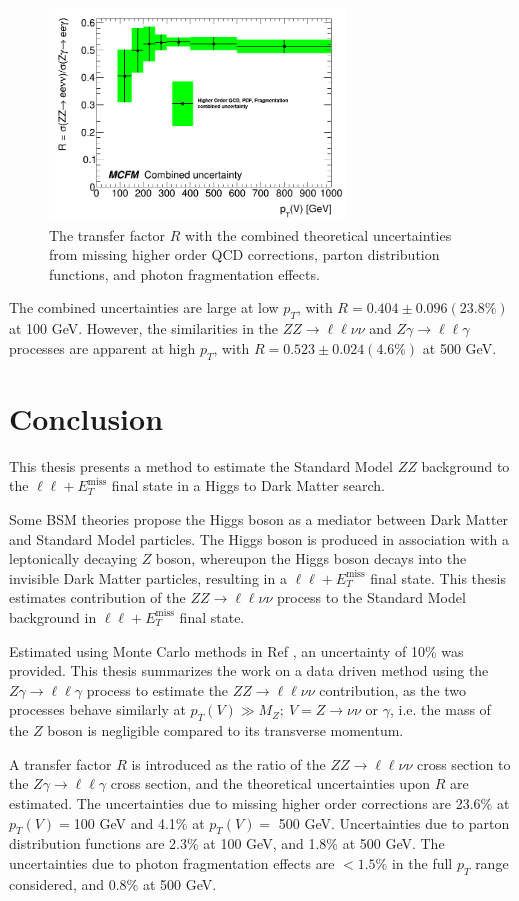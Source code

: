 \documentclass[12pt,a4paper,openright,twoside]{report}
\newcommand{\ZZ}{$ZZ\to \ell\ell\nu\nu$ }
\newcommand{\Zg}{$Z\gamma\to \ell\ell\gamma$ }
\newcommand{\llM}{$\ell\ell+E_T^{\mathrm{miss}}$ }
\begin{document}
\begin{figure}[H]
\centering
	\includegraphics[width=0.7\textwidth]{summary.png}
	\caption{The transfer factor $R$ with the combined theoretical uncertainties from missing higher order QCD corrections, parton distribution functions, and photon fragmentation effects.}
	\label{fig:summary}
\end{figure}

The combined uncertainties are large at low $p_T$, with $R=0.404\pm 0.096(23.8\%)$ at 100 GeV. However, the similarities in the \ZZ and \Zg processes are apparent at high $p_T$, with $R=0.523\pm 0.024 (4.6\%)$ at 500 GeV.

\chapter{Conclusion}
This thesis presents a method to estimate the Standard Model $ZZ$ background to the \llM final state in a Higgs to Dark Matter search. 

Some BSM theories propose the Higgs boson as a mediator between Dark Matter and Standard Model particles. The Higgs boson is produced in association with a leptonically decaying $Z$ boson, whereupon the Higgs boson decays into the invisible Dark Matter particles, resulting in a \llM final state. This thesis estimates contribution of the \ZZ process to the Standard Model background in \llM final state.

Estimated using Monte Carlo methods in Ref \cite{ZH_ATLAS}, an uncertainty of 10\% was provided. This thesis summarizes the work on a data driven method using the \Zg process to estimate the \ZZ contribution, as the two processes behave similarly at $p_T(V) \gg M_Z;\ V=Z\to\nu\nu$ or $\gamma$, i.e. the mass of the $Z$ boson is negligible compared to its transverse momentum.

A transfer factor $R$ is introduced as the ratio of the \ZZ cross section to the \Zg cross section, and the theoretical uncertainties upon $R$ are estimated. The uncertainties due to missing higher order corrections are 23.6\% at $p_T(V)=$100 GeV and 4.1\% at $p_T(V)=$ 500 GeV. Uncertainties due to parton distribution functions are 2.3\% at 100 GeV, and 1.8\% at 500 GeV. The uncertainties due to photon fragmentation effects are $<1.5\%$ in the full $p_T$ range considered, and 0.8\% at 500 GeV. 
\end{document}
